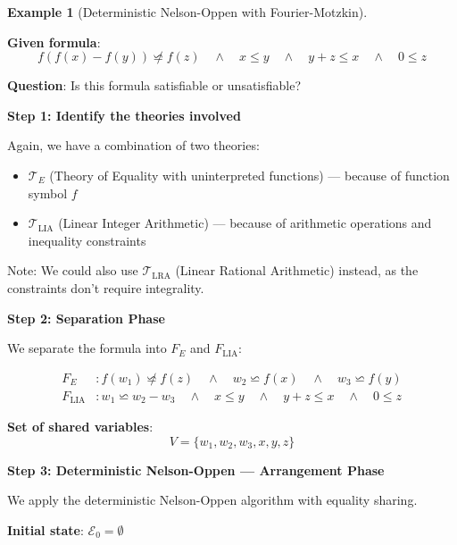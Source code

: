 \documentclass[11pt,a4paper]{article}
\theoremstyle{definition}
\newtheorem{example}{Example}[section]
\theoremstyle{plain}
\theoremstyle{remark}
\begin{document}
\begin{example}[Deterministic Nelson-Oppen with Fourier-Motzkin]
\begin{tcolorbox}[colback=blue!5!white,colframe=blue!75!black,title=\textbf{Example 2: UNSAT with Equality Propagation},breakable]
\textbf{Given formula}:
\[
f(f(x) - f(y)) \not\backsimeq f(z) \quad \wedge \quad x \leq y \quad \wedge \quad y + z \leq x \quad \wedge \quad 0 \leq z
\]

\textbf{Question}: Is this formula satisfiable or unsatisfiable?

\vspace{0.5em}

\textbf{Step 1: Identify the theories involved}

Again, we have a combination of two theories:
\begin{itemize}
    \item $\mathcal{T}_E$ (Theory of Equality with uninterpreted functions) — because of function symbol $f$
    \item $\mathcal{T}_{\text{LIA}}$ (Linear Integer Arithmetic) — because of arithmetic operations and inequality constraints
\end{itemize}

Note: We could also use $\mathcal{T}_{\text{LRA}}$ (Linear Rational Arithmetic) instead, as the constraints don't require integrality.

\vspace{0.5em}

\textbf{Step 2: Separation Phase}

We separate the formula into $F_E$ and $F_{\text{LIA}}$:

\begin{align*}
F_E &: f(w_1) \not\backsimeq f(z) \quad \wedge \quad w_2 \backsimeq f(x) \quad \wedge \quad w_3 \backsimeq f(y) \\
F_{\text{LIA}} &: w_1 \backsimeq w_2 - w_3 \quad \wedge \quad x \leq y \quad \wedge \quad y + z \leq x \quad \wedge \quad 0 \leq z
\end{align*}

\textbf{Set of shared variables}:
\[
V = \{w_1, w_2, w_3, x, y, z\}
\]

\vspace{0.5em}

\textbf{Step 3: Deterministic Nelson-Oppen — Arrangement Phase}

We apply the deterministic Nelson-Oppen algorithm with equality sharing.

\textbf{Initial state}: $\mathcal{E}_0 = \emptyset$


\end{tcolorbox}
\end{example}
\end{document}

